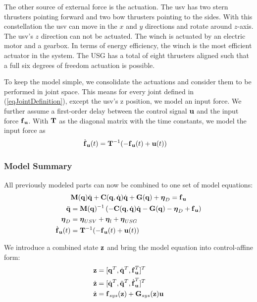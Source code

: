 \documentclass[a4paper,11pt]{article}
\newcommand{\Mat}[1]{\mathbf{\MakeUppercase{#1}}}
\renewcommand{\vec}[1]{\boldsymbol{\mathbf{\MakeLowercase{#1}}}}
\begin{document}
The other source of external force is the actuation. The \gls{usv} has two stern thrusters pointing forward and two bow thrusters pointing to the sides. With this constellation the \gls{usv} can move in the $x$ and $y$ directions and rotate around $z$-axis. The \gls{usv}'s $z$ direction can not be actuated. The winch is actuated by an electric motor and a gearbox. In terms of energy efficiency, the winch is the most efficient actuator in the system. The USG has a total of eight thrusters aligned such that a full six degrees of freedom actuation is possible.

To keep the model simple, we consolidate the actuations and consider them to be performed in joint space. This means for every joint defined in (\ref{eqJointDefinition}), except the \gls{usv}'s z position, we model an input force. We further assume a first-order delay between the control signal $\vec u$ and the input force $\vec{f}_{\vec{u}}$. With $\Mat{T}$ as the diagonal matrix with the time constants, we model the input force as
\begin{align}
\dot{\vec{f}}_{\vec{u}}(t) &= \Mat{T}^{-1} (-\vec{f}_{\vec{u}}(t) + \vec{u}(t))
\end{align}

\subsubsection{Model Summary}
All previously modeled parts can now be combined to one set of model equations: 
	\begin{subequations}
	\begin{align}
	& \Mat{M}(\vec{q}) \ddot{\vec{q}} + \Mat{C}(\vec{q}, \dot{\vec{q}}) \dot{\vec{q}} + \Mat{G}(\vec{q}) + \vec{\eta}_D = \vec{f}_{\vec{u}}
	\\
	\ddot{\vec{q}} &= \Mat{M}(\vec{q})^{-1} \left( -	\Mat{C}(\vec{q}, \dot{\vec{q}}) \dot{\vec{q}} - \Mat{G}(\vec{q}) - \vec{\eta}_D + \vec{f}_{\vec{u}} \right)
	\\
	\vec{\eta}_D &= \vec{\eta}_{USV} + \vec{\eta}_{l} + \vec{\eta}_{USG}
	\\
	\dot{\vec{f}}_{\vec{u}}(t) &= \Mat{T}^{-1} (-\vec{f}_{\vec{u}}(t) + \vec{u}(t))
	\end{align}
\end{subequations}

We introduce a combined state $ \vec{z}$ and bring the model equation into control-affine form:
\begin{subequations}
	\begin{align}
	\vec{z} &= [\vec{q}^T, \dot{\vec{q}}^T, \vec{f}_{\vec{u}}^T]^T
	\\
	\dot{\vec{z}} &= [\dot{\vec{q}}^T, \ddot{\vec{q}}^T, \dot{\vec{f}}_{\vec{u}}^T]^T
	\\
	\dot{\vec{z}} &= \vec{f}_{sys}(\vec{z}) + \Mat{G}_{sys}(\vec{z}) \vec{u}
	\end{align}
\end{subequations}
\end{document}
